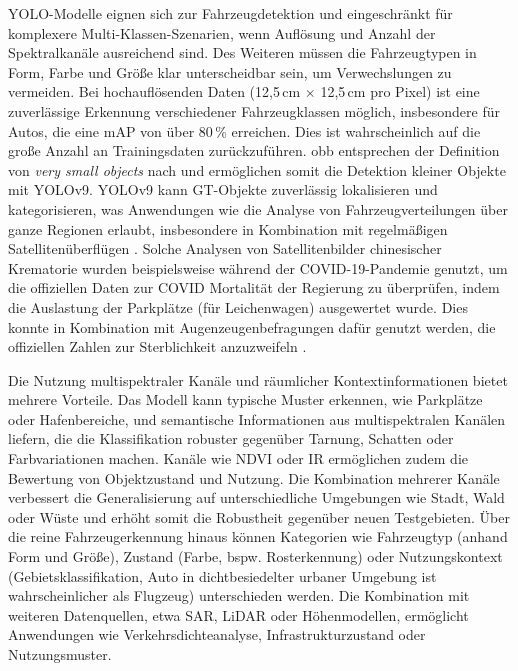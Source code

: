YOLO-Modelle eignen sich zur Fahrzeugdetektion und eingeschränkt für komplexere Multi-Klassen-Szenarien, wenn Auflösung und Anzahl der Spektralkanäle ausreichend sind. Des Weiteren müssen die Fahrzeugtypen in Form, Farbe und Größe klar unterscheidbar sein, um Verwechslungen zu vermeiden. Bei hochauflösenden Daten (12,5\,cm $\times$ 12,5\,cm pro Pixel) ist eine zuverlässige Erkennung verschiedener Fahrzeugklassen möglich, insbesondere für Autos, die eine mAP von über 80\,\% erreichen. Dies ist wahrscheinlich auf die große Anzahl an Trainingsdaten zurückzuführen. \acrshort{obb} entsprechen der Definition von \textit{very small objects} nach \citeauthor{Chen2017} \cite{Chen2017} und ermöglichen somit die Detektion kleiner Objekte mit \acrshort{YOLO}v9.  \acrshort{YOLO}v9 kann \Acrlong{GT}-Objekte zuverlässig lokalisieren und kategorisieren, was Anwendungen wie die Analyse von Fahrzeugverteilungen über ganze Regionen erlaubt, insbesondere in Kombination mit regelmäßigen Satellitenüberflügen \cite{planet_labs, airbus_neo}. Solche Analysen von Satellitenbilder chinesischer Krematorie wurden beispielsweise während der COVID-19-Pandemie genutzt, um die offiziellen Daten zur COVID Mortalität der Regierung zu überprüfen, indem die Auslastung der Parkplätze (für Leichenwagen) ausgewertet wurde. Dies konnte in Kombination mit Augenzeugenbefragungen dafür genutzt werden, die offiziellen Zahlen zur Sterblichkeit anzuzweifeln \cite{Spiegel_article}.  

Die Nutzung multispektraler Kanäle und räumlicher Kontextinformationen bietet mehrere Vorteile. Das Modell kann typische Muster erkennen, wie Parkplätze oder Hafenbereiche, und semantische Informationen aus multispektralen Kanälen liefern, die die Klassifikation robuster gegenüber Tarnung, Schatten oder Farbvariationen machen. Kanäle wie \acrshort{NDVI} oder \acrshort{IR} ermöglichen zudem die Bewertung von Objektzustand und Nutzung. Die Kombination mehrerer Kanäle verbessert die Generalisierung auf unterschiedliche Umgebungen wie Stadt, Wald oder Wüste und erhöht somit die Robustheit gegenüber neuen Testgebieten. Über die reine Fahrzeugerkennung hinaus können Kategorien wie Fahrzeugtyp (anhand Form und Größe), Zustand (Farbe, bspw. Rosterkennung) oder Nutzungskontext (Gebietsklassifikation, Auto in dichtbesiedelter urbaner Umgebung ist wahrscheinlicher als Flugzeug) unterschieden werden. Die Kombination mit weiteren Datenquellen, etwa \acrshort{SAR}, \acrshort{LiDAR} oder Höhenmodellen, ermöglicht Anwendungen wie Verkehrsdichteanalyse, Infrastrukturzustand oder Nutzungsmuster.


